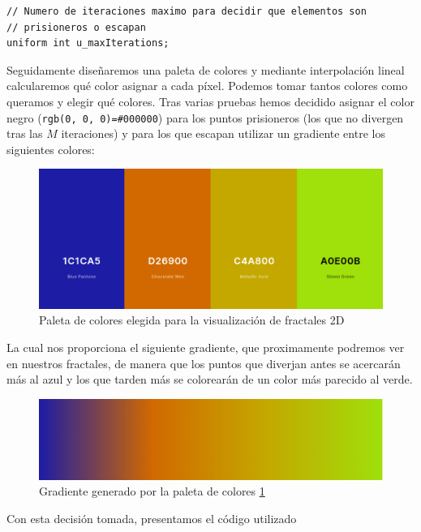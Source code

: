 \begin{lstlisting}
// Numero de iteraciones maximo para decidir que elementos son
// prisioneros o escapan
uniform int u_maxIterations;
\end{lstlisting}

Seguidamente diseñaremos una paleta de colores y mediante interpolación lineal calcularemos qué color asignar a cada píxel. Podemos tomar tantos colores como queramos y elegir qué colores. Tras varias pruebas hemos decidido asignar el color negro (\verb|rgb(0, 0, 0)=#000000|) para los puntos prisioneros (los que no divergen tras las $M$ iteraciones) y para los que escapan utilizar un gradiente entre los siguientes colores:

\begin{figure} [ht]
    \centering
    \includegraphics[scale = 0.4]{img/C6/paleta.png}
    \caption{Paleta de colores elegida para la visualización de fractales 2D}
    \label{fig:paleta}
\end{figure}

La cual nos proporciona el siguiente gradiente, que proximamente podremos ver en nuestros fractales, de manera que los puntos que diverjan antes se acercarán más al azul y los que tarden más se colorearán de un color más parecido al verde.

\begin{figure} [ht]
    \centering
    \includegraphics[scale = 0.51]{img/C6/gradiente.png}
    \caption{Gradiente generado por la paleta de colores \ref{fig:paleta}}
    \label{fig:gradiente}
\end{figure}

Con esta decisión tomada, presentamos el código utilizado

